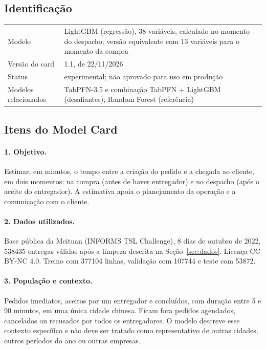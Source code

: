 \documentclass[11pt,a4paper]{article}
\begin{document}
\subsection{Identificação}

\begin{table}[H]
\centering\small
\begin{tabularx}{\linewidth}{l L}
\toprule
Modelo & LightGBM (regressão), 38 variáveis, calculado no momento do despacho; versão equivalente com 13 variáveis para o momento da compra \\
Versão do card & 1.1, de 22/11/2026 \\
Status & experimental; não aprovado para uso em produção \\
Modelos relacionados & TabPFN-3.5 e combinação TabPFN + LightGBM (desafiantes); Random Forest (referência) \\
\bottomrule
\end{tabularx}
\end{table}

\subsection{Itens do Model Card}

\paragraph{1. Objetivo.} Estimar, em minutos, o tempo entre a criação do pedido e a chegada ao
cliente, em dois momentos: na compra (antes de haver entregador) e no despacho (após o aceite
do entregador). A estimativa apoia o planejamento da operação e a comunicação com o cliente.

\paragraph{2. Dados utilizados.} Base pública da Meituan (INFORMS TSL Challenge), 8 dias de
outubro de 2022, \num{538435} entregas válidas após a limpeza descrita na
Seção~\ref{sec:dados}. Licença CC BY-NC 4.0. Treino com \num{377104} linhas, validação com
\num{107744} e teste com \num{53872}.

\paragraph{3. População e contexto.} Pedidos imediatos, aceitos por um entregador e
concluídos, com duração entre 5 e 90 minutos, em uma única cidade chinesa. Ficam fora pedidos
agendados, cancelados ou recusados por todos os entregadores. O modelo descreve esse
contexto específico e não deve ser tratado como representativo de outras cidades, outros
períodos do ano ou outras empresas.
\end{document}

